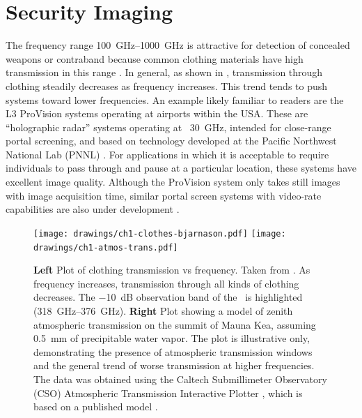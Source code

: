 \section{Security Imaging}

The frequency range \SIrange{100}{1000}{\GHz} is attractive for detection of concealed weapons or contraband because common clothing materials have high transmission in this range \cite{bjarnason_millimeter-wave_2004}.
In general, as shown in , transmission through clothing steadily decreases as frequency increases.
This trend tends to push systems toward lower frequencies.
An example likely familiar to readers are the L3 ProVision systems operating at airports within the USA.
These are ``holographic radar'' systems operating at ~\SI{30}{\GHz}, intended for close-range portal screening, and based on technology developed at the Pacific Northwest National Lab (PNNL) \cite{sheen_cylindrical_1998,mcmakin_dual-surface_2009}.
For applications in which it is acceptable to require individuals to pass through and pause at a particular location, these systems have excellent image quality.
Although the ProVision system only takes still images with  image acquisition time, similar portal screen systems with video-rate capabilities are also under development \cite{lyons_reflect-array_2013}.

\begin{figure}
\centering
\texttt{[image: drawings/ch1-clothes-bjarnason.pdf]}
\texttt{[image: drawings/ch1-atmos-trans.pdf]}
\caption[Clothing and Atmospheric Transmission vs Frequency]{
  \textbf{Left}
  Plot of clothing transmission vs frequency.
  Taken from \cite{bjarnason_millimeter-wave_2004}.
  As frequency increases, transmission through all kinds of clothing decreases.
  The \SI{-10}{\dB} observation band of the \Imager\ is highlighted (\SIrange{318}{376}{\GHz}).
  \textbf{Right}
  Plot showing a model of zenith atmospheric transmission on the summit of Mauna Kea, assuming \SI{0.5}{\mm} of precipitable water vapor.
  The plot is illustrative only, demonstrating the presence of atmospheric transmission windows and the general trend of worse transmission at higher frequencies.
  The data was obtained using the Caltech Submillimeter Observatory (CSO) Atmospheric Transmission Interactive Plotter \cite{darek_lis_cso_????}, which is based on a published model \cite{pardo_atmospheric_2001}.
}
\label{fig:ch1-clothes-atmos-trans}
\end{figure}

